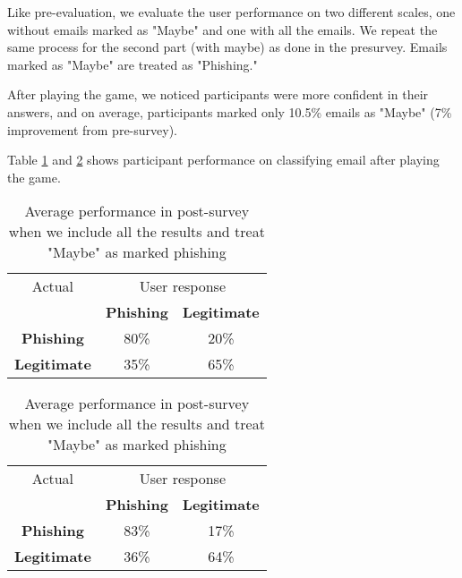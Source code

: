 Like pre-evaluation, we evaluate the user performance on two different scales, one without emails marked as "Maybe" and one with all the emails. We repeat the same process for the second part (with maybe) as done in the presurvey. Emails marked as "Maybe" are treated as "Phishing."

After playing the game, we noticed participants were more confident in their answers, and on average, participants marked only 10.5\% emails as "Maybe" (7\% improvement from pre-survey).

Table \ref{tab:post_survey_responses} and \ref{tab:post_survey_responses_all} shows participant performance on classifying email after playing the game.


\begin{table}[!ht]
    \begin{center}

        \begin{tabular}{c | c c}
            Actual              & \multicolumn{2}{c}{User response}                       \\
                                & \textbf{Phishing}                 & \textbf{Legitimate} \\
            \textbf{Phishing}   & 80\%                              & 20\%                \\
            \textbf{Legitimate} & 35\%                              & 65\%                \\
        \end{tabular}
        \caption[Average performance in post-survey (I)]{Average performance in post-survey when we include all the results and treat "Maybe" as marked phishing}
        \label{tab:post_survey_responses}
    \end{center}
\end{table}


\begin{table}[!ht]
    \begin{center}

        \begin{tabular}{c | c c}
            Actual              & \multicolumn{2}{c}{User response}                       \\
                                & \textbf{Phishing}                 & \textbf{Legitimate} \\
            \textbf{Phishing}   & 83\%                              & 17\%                \\
            \textbf{Legitimate} & 36\%                              & 64\%                \\
        \end{tabular}
        \caption[Average performance in post-survey (II)]{Average performance in post-survey when we include all the results and treat "Maybe" as marked phishing}
        \label{tab:post_survey_responses_all}
    \end{center}
\end{table}

